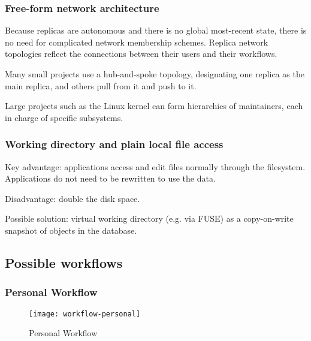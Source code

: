 \documentclass[a4paper]{article}
\begin{document}
\subsubsection{Free-form network architecture}

Because replicas are autonomous and there is no global most-recent state, there
is no need for complicated network membership schemes. Replica network
topologies reflect the connections between their users and their workflows.

Many small projects use a hub-and-spoke topology, designating one replica as the
main replica, and others pull from it and push to it.

Large projects such as the Linux kernel can form hierarchies of maintainers,
each in charge of specific subsystems.


\subsubsection{Working directory and plain local file access}

Key advantage: applications access and edit files normally through the
filesystem. Applications do not need to be rewritten to use the data.

Disadvantage: double the disk space.

Possible solution: virtual working directory (e.g. via FUSE) as a
copy-on-write snapshot of objects in the database.


\subsection{Possible workflows}\label{possible-workflows}

\subsubsection{Personal Workflow}

  \begin{figure}[h]
    \caption{Personal Workflow}
    \label{fig:workflow-personal}
    \centering
      \texttt{[image: workflow-personal]}
  \end{figure}
\end{document}
